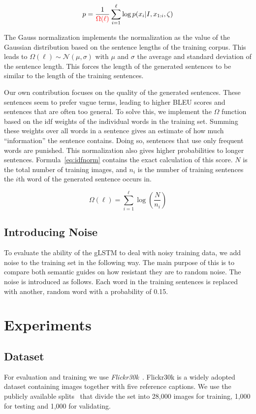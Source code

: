 \documentclass[twoside,twocolumn]{article}
\begin{document}
	\begin{equation}
	p = \frac{1}{\color{red}{\Omega(\ell)}}\sum_{i=1}^{\ell} \log p(x_i | I, x_{1:i}, \zeta)
	\label{eq:log-sentence-norm}
	\end{equation}
	
	The Gauss normalization implements the normalization as the value of the Gaussian distribution based on the sentence lengths of the training corpus. This leads to $\Omega(\ell) \sim \mathcal{N}(\mu, \sigma)$ with $\mu$ and $\sigma$ the average and standard deviation of the sentence length. This forces the length of the generated sentences to be similar to the length of the training sentences.
	
	Our own contribution focuses on the quality of the generated sentences. These sentences seem to prefer vague terms, leading to higher BLEU scores and sentences that are often too general. To solve this, we implement the $\Omega$ function based on the idf weights of the individual words in the training set. Summing these weights over all words in a sentence gives an estimate of how much ``information'' the sentence contains. Doing so, sentences that use only frequent words are punished. This normalization also gives higher probabilities to longer sentences. Formula~\eqref{eq:idfnorm} contains the exact calculation of this score. $N$ is the total number of training images, and $n_i$ is the number of training sentences the $i$th word of the generated sentence occurs in.
	
	\begin{equation}
		\Omega(\ell) = \sum_{i=1}^{\ell}\log(\frac{N}{n_i})
		\label{eq:idfnorm}
	\end{equation}

	\subsection{Introducing Noise}
	\label{sec:noise}
	To evaluate the ability of the gLSTM to deal with noisy training data, we add noise to the training set in the following way. The main purpose of this is to compare both semantic guides on how resistant they are to random noise. The noise is introduced as follows. Each word in the training sentences is replaced with another, random word with a probability of 0.15.
	
	\section{Experiments}
	\label{sec:exp}
	\subsection{Dataset}
	For evaluation and training we use \emph{Flickr30k}~\cite{Young2014}. Flickr30k is a widely adopted dataset containing images together with five reference captions. We use the publicly available splits~\cite{Karpathy2014} that divide the set into 28,000 images for training, 1,000 for testing and 1,000 for validating. 
	
\end{document}
